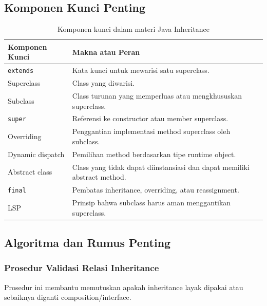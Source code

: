 \subsection{Komponen Kunci Penting}

\begin{table}[H]
\centering
\begin{tabularx}{\textwidth}{|L{0.28\textwidth}|X|}
\hline
\textbf{Komponen Kunci} & \textbf{Makna atau Peran} \\
\hline
\texttt{extends} & Kata kunci untuk mewarisi satu superclass. \\
\hline
Superclass & Class yang diwarisi. \\
\hline
Subclass & Class turunan yang memperluas atau mengkhususkan superclass. \\
\hline
\texttt{super} & Referensi ke constructor atau member superclass. \\
\hline
Overriding & Penggantian implementasi method superclass oleh subclass. \\
\hline
Dynamic dispatch & Pemilihan method berdasarkan tipe runtime object. \\
\hline
Abstract class & Class yang tidak dapat diinstansiasi dan dapat memiliki abstract method. \\
\hline
\texttt{final} & Pembatas inheritance, overriding, atau reassignment. \\
\hline
LSP & Prinsip bahwa subclass harus aman menggantikan superclass. \\
\hline
\end{tabularx}
\caption{Komponen kunci dalam materi Java Inheritance}
\label{tab:komponen-kunci-java-inheritance}
\end{table}

\subsection{Algoritma dan Rumus Penting}

\subsubsection{Prosedur Validasi Relasi Inheritance}

\begin{jawab}
Prosedur ini membantu memutuskan apakah inheritance layak dipakai atau sebaiknya diganti composition/interface.
\end{jawab}

